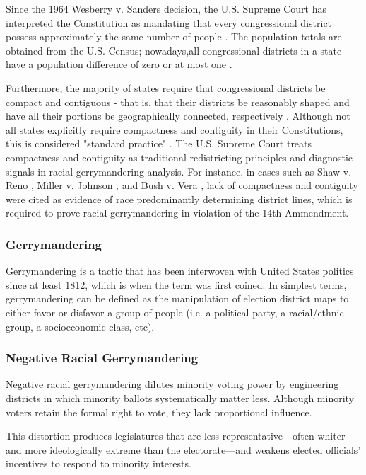 \documentclass[sn-vancouver,Numbered]{sn-jnl}
\theoremstyle{thmstyleone}%
\theoremstyle{thmstyletwo}%
\theoremstyle{thmstylethree}%
\begin{document}
Since the 1964 Wesberry v. Sanders decision, the U.S. Supreme Court has interpreted the Constitution as mandating that every congressional district possess approximately the same number of people \cite{EckmanWhitaker2025MidDecade}. The population totals are obtained from the U.S. Census; nowadays,all congressional districts in a state have a population difference of zero or at most one \cite{Duchin2023PoliticalGeometry}.

Furthermore, the majority of states require that congressional districts be compact and contiguous - that is, that their districts be reasonably shaped and have all their portions be geographically connected, respectively \cite{Duchin2023PoliticalGeometry}. Although not all states explicitly require compactness and contiguity in their Constitutions, this is considered "standard practice" \cite{deford2021recombination}. The U.S. Supreme Court treats compactness and contiguity as traditional redistricting principles and diagnostic signals in racial gerrymandering analysis. For instance, in cases such as Shaw v. Reno \cite{Shaw1993}, Miller v. Johnson \cite{Miller1995}, and Bush v. Vera \cite{Bush1996}, lack of compactness and contiguity were cited as evidence of race predominantly determining district lines, which is required to prove racial gerrymandering in violation of the 14th Ammendment.

\subsubsection{Gerrymandering}
Gerrymandering is a tactic that has been interwoven with United States politics since at least 1812, which is when the term was first coined. In simplest terms, gerrymandering can be defined as the manipulation of election district maps to either favor or disfavor a group of people (i.e. a political party, a racial/ethnic group, a socioeconomic class, etc). 

\subsubsection{Negative Racial Gerrymandering}
Negative racial gerrymandering dilutes minority voting power by engineering districts in which minority ballots systematically matter less. Although minority voters retain the formal right to vote, they lack proportional influence.

This distortion produces legislatures that are less representative—often whiter and more ideologically extreme than the electorate—and weakens elected officials’ incentives to respond to minority interests.
\end{document}
